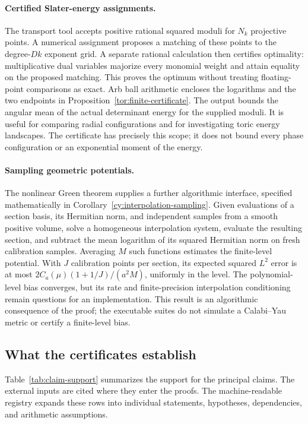 \paragraph{Certified Slater-energy assignments.}
The transport tool accepts positive rational squared moduli for $N_k$
projective points. A numerical assignment proposes a matching of these
points to the degree-$Dk$ exponent grid. A separate rational calculation
then certifies optimality: multiplicative dual variables majorize every
monomial weight and attain equality on the proposed matching. This proves
the optimum without treating floating-point comparisons as exact.
Arb ball arithmetic encloses the logarithms and the two endpoints in
Proposition~\ref{tor:finite-certificate}. The output bounds the angular
mean of the actual determinant energy for the supplied moduli. It is
useful for comparing radial configurations and for investigating toric
energy landscapes. The certificate has precisely this scope; it does not
bound every phase configuration or an exponential moment of the energy.

\paragraph{Sampling geometric potentials.}
The nonlinear Green theorem supplies a further algorithmic interface,
specified mathematically in Corollary~\ref{cy:interpolation-sampling}.
Given evaluations of a section basis, its Hermitian norm, and independent
samples from a smooth positive volume, solve a homogeneous interpolation
system, evaluate the resulting section, and subtract the mean logarithm
of its squared Hermitian norm on fresh calibration samples. Averaging $M$ such functions estimates the
finite-level potential. With $J$ calibration points per section, its
expected squared $L^2$ error is at most
$2C_a(\mu)(1+1/J)/(a^2M)$, uniformly in the level. The polynomial-level
bias converges, but its rate and finite-precision interpolation conditioning
remain questions for an implementation. This result is an algorithmic
consequence of the proof; the executable suites do not simulate a
Calabi--Yau metric or certify a finite-level bias.

\subsection{What the certificates establish}

Table~\ref{tab:claim-support} summarizes the support for the principal
claims. The external inputs are cited where they enter the proofs. The
machine-readable registry expands these rows into individual statements,
hypotheses, dependencies, and arithmetic assumptions.

